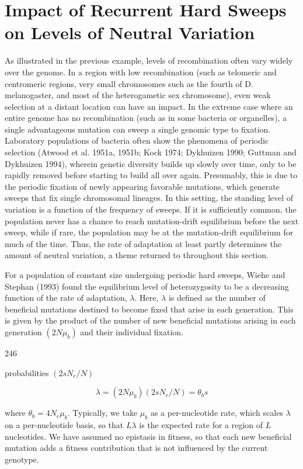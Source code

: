 \documentclass{article}
\begin{document}
\section{Impact of Recurrent Hard Sweeps on Levels of Neutral Variation}
As illustrated in the previous example, levels of recombination often vary widely over the genome. In a region with low recombination (such as telomeric and centromeric regions, very small chromosomes such as the fourth of D. melanogaster, and most of the heterogametic sex chromosome), even weak selection at a distant location can have an impact. In the extreme case where an entire genome has no recombination (such as in some bacteria or organelles), a single advantageous mutation can sweep a single genomic type to fixation. Laboratory populations of bacteria often show the phenomena of periodic selection (Atwood et al. 1951a, 1951b; Kock 1974; Dykhuizen 1990; Guttman and Dykhuizen 1994), wherein genetic diversity builds up slowly over time, only to be rapidly removed before starting to build all over again. Presumably, this is due to the periodic fixation of newly appearing favorable mutations, which generate sweeps that fix single chromosomal lineages. In this setting, the standing level of variation is a function of the frequency of sweeps. If it is sufficiently common, the population never has a chance to reach mutation-drift equilibrium before the next sweep, while if rare, the population may be at the mutation-drift equilibrium for much of the time. Thus, the rate of adaptation at least partly determines the amount of neutral variation, a theme returned to throughout this section.

For a population of constant size undergoing periodic hard sweeps, Wiehe and Stephan (1993) found the equilibrium level of heterozygosity to be a decreasing function of the rate of adaptation,  $ \lambda $. Here,  $ \lambda $ is defined as the number of beneficial mutations destined to become fixed that arise in each generation. This is given by the product of the number of new beneficial mutations arising in each generation  $ (2N\mu_b) $ and their individual fixation.

246

probabilities  $ (2sN_{e}/N) $

\begin{equation}
\lambda=(2N\mu_{b})(2s N_{e}/N)=\theta_{b}s
\tag{8.24a}
\label{eq:8_24a}
\end{equation}

where  $ \theta_b = 4N_e\mu_b $. Typically, we take  $ \mu_b $ as a per-nucleotide rate, which scales  $ \lambda $ on a per-nucleotide basis, so that  $ L\lambda $ is the expected rate for a region of  $ L $ nucleotides. We have assumed no epistasis in fitness, so that each new beneficial mutation adds a fitness contribution that is not influenced by the current genotype.
\end{document}

